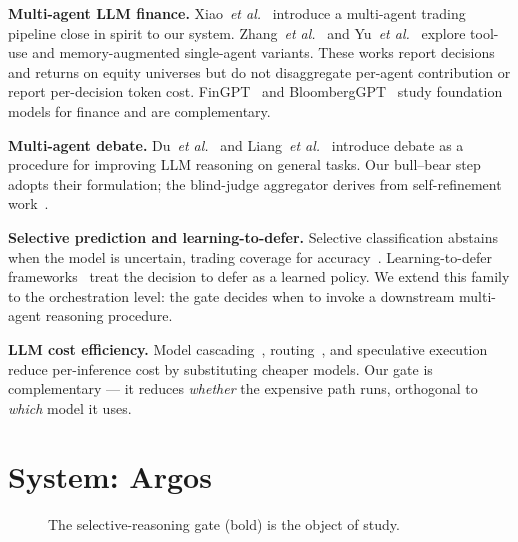 \documentclass[conference]{IEEEtran}
\begin{document}
\textbf{Multi-agent LLM finance.}
Xiao~\emph{et al.}~\cite{tradingagents} introduce a multi-agent
trading pipeline close in spirit to our system. Zhang~\emph{et
al.}~\cite{finagent} and Yu~\emph{et al.}~\cite{finmem} explore
tool-use and memory-augmented single-agent variants. These works
report decisions and returns on equity universes but do not
disaggregate per-agent contribution or report per-decision token
cost. FinGPT~\cite{fingpt} and BloombergGPT~\cite{bloomberggpt}
study foundation models for finance and are complementary.

\textbf{Multi-agent debate.}
Du~\emph{et al.}~\cite{du2023debate} and Liang~\emph{et
al.}~\cite{liang2023divergent} introduce debate as a procedure for
improving LLM reasoning on general tasks. Our bull--bear step adopts
their formulation; the blind-judge aggregator derives from
self-refinement work~\cite{madaan2023selfrefine}.

\textbf{Selective prediction and learning-to-defer.}
Selective classification abstains when the model is uncertain, trading
coverage for accuracy~\cite{chow1970,geifman2017selective,
geifman2019selectivenet}. Learning-to-defer frameworks~\cite{
mozannar2020defer,charusaie2022sample} treat the decision to defer as
a learned policy. We extend this family to the orchestration level:
the gate decides when to invoke a downstream multi-agent reasoning
procedure.

\textbf{LLM cost efficiency.}
Model cascading~\cite{chen2023frugalgpt},
routing~\cite{ong2024routellm}, and speculative
execution~\cite{leviathan2023speculative} reduce per-inference cost by
substituting cheaper models. Our gate is complementary --- it reduces
\emph{whether} the expensive path runs, orthogonal to \emph{which}
model it uses.

\section{System: Argos}
\label{sec:system}

\begin{figure}[t]
  \centering
  \caption{The selective-reasoning gate (bold) is the object of study.}
  \label{fig:topology}
\end{figure}
\end{document}
